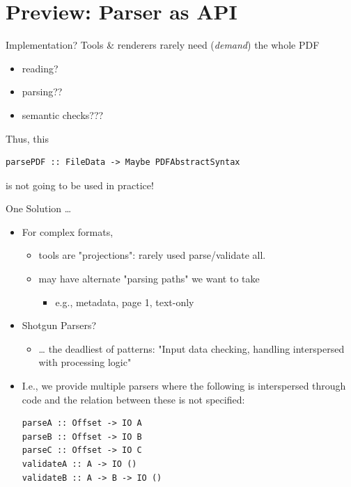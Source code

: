 \documentclass[t,10pt,xcolor={dvipsnames}]{beamer}
\begin{document}
\section{Preview: Parser as API}
\label{sec:org3f054ca}
\begin{frame}[label={sec:orge3de404},fragile]{Implementation?}
 Tools \& renderers rarely need (\emph{demand}) the whole PDF
\begin{itemize}
\item reading?
\item parsing??
\item semantic checks???
\end{itemize}
\vspace{12pt}

Thus, this
\lstset{language=haskell,label= ,caption= ,captionpos=b,numbers=none}
\begin{lstlisting}
parsePDF :: FileData -> Maybe PDFAbstractSyntax
\end{lstlisting}
is not going to be used in practice!     
\end{frame}

\begin{frame}[label={sec:orgd9e8c39},fragile]{One Solution \ldots{}}
 \begin{itemize}
\item For complex formats,
\begin{itemize}
\item tools are "projections": rarely used parse/validate all.
\item may have alternate "parsing paths" we want to take
\begin{itemize}
\item e.g., metadata, page 1, text-only
\end{itemize}
\end{itemize}

\item Shotgun Parsers?
\begin{itemize}
\item \ldots{} the deadliest of patterns: "Input data checking, handling interspersed
with processing logic"
\end{itemize}

\item I.e., we provide multiple parsers where the following is interspersed through
code and the relation between these is \alert{not specified}:
\lstset{language=haskell,label= ,caption= ,captionpos=b,numbers=none}
\begin{lstlisting}
parseA :: Offset -> IO A
parseB :: Offset -> IO B
parseC :: Offset -> IO C
validateA :: A -> IO ()
validateB :: A -> B -> IO ()
\end{lstlisting}
\end{itemize}
\end{frame}
\end{document}
